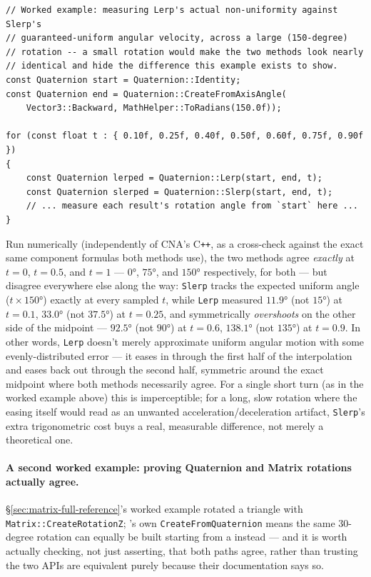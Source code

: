 \begin{lstlisting}
// Worked example: measuring Lerp's actual non-uniformity against Slerp's
// guaranteed-uniform angular velocity, across a large (150-degree)
// rotation -- a small rotation would make the two methods look nearly
// identical and hide the difference this example exists to show.
const Quaternion start = Quaternion::Identity;
const Quaternion end = Quaternion::CreateFromAxisAngle(
    Vector3::Backward, MathHelper::ToRadians(150.0f));

for (const float t : { 0.10f, 0.25f, 0.40f, 0.50f, 0.60f, 0.75f, 0.90f })
{
    const Quaternion lerped = Quaternion::Lerp(start, end, t);
    const Quaternion slerped = Quaternion::Slerp(start, end, t);
    // ... measure each result's rotation angle from `start` here ...
}
\end{lstlisting}

Run numerically (independently of CNA's C\texttt{++}, as a cross-check against the exact same
component formulas both methods use), the two methods agree \emph{exactly} at $t=0$, $t=0.5$,
and $t=1$ --- $0$°, $75$°, and $150$° respectively, for both --- but disagree everywhere else
along the way: \texttt{Slerp} tracks the expected uniform angle ($t \times 150$°) exactly at
every sampled $t$, while \texttt{Lerp} measured $11.9$° (not $15$°) at $t=0.1$, $33.0$° (not
$37.5$°) at $t=0.25$, and symmetrically \emph{overshoots} on the other side of the midpoint ---
$92.5$° (not $90$°) at $t=0.6$, $138.1$° (not $135$°) at $t=0.9$. In other words, \texttt{Lerp}
doesn't merely approximate uniform angular motion with some evenly-distributed error --- it
eases in through the first half of the interpolation and eases back out through the second
half, symmetric around the exact midpoint where both methods necessarily agree. For a single
short turn (as in the worked example above) this is imperceptible; for a long, slow rotation
where the easing itself would read as an unwanted acceleration/deceleration artifact,
\texttt{Slerp}'s extra trigonometric cost buys a real, measurable difference, not merely a
theoretical one.

\paragraph{A second worked example: proving Quaternion and Matrix rotations actually agree.}
\S\ref{sec:matrix-full-reference}'s worked example rotated a triangle with
\texttt{Matrix::CreateRotationZ}; 's own \texttt{CreateFromQuaternion} means
the same 30-degree rotation can equally be built starting from a  instead
--- and it is worth actually checking, not just asserting, that both paths agree, rather than
trusting the two APIs are equivalent purely because their documentation says so.

